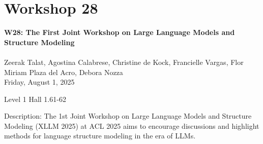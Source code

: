 \clearpage


\section[W28: The First Joint Workshop on Large Language Models and Structure Modeling]{Workshop 28}
\label{workshop_28}

\begin{center}
    {\Large \textbf{W28: The First Joint Workshop on Large Language Models and Structure Modeling }}\\
\\

Zeerak Talat, Agostina Calabrese, Christine de Kock, Francielle Vargas, Flor Miriam Plaza del Acro, Debora Nozza\\

    Friday, August 1, 2025

Level 1 Hall 1.61-62

\end{center}

Description: The 1st Joint Workshop on Large Language Models and Structure Modeling (XLLM 2025) at ACL 2025 aims to encourage discussions and highlight methods for language structure modeling in the era of LLMs.  
